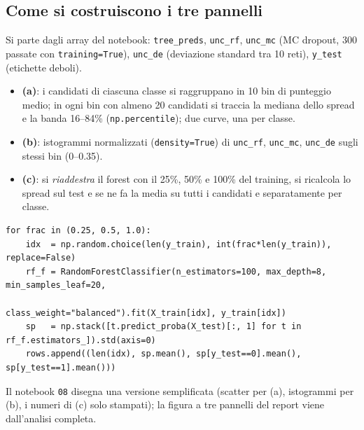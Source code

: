 \documentclass[10.5pt,a4paper]{article}
\begin{document}
\subsection*{Come si costruiscono i tre pannelli}
Si parte dagli array del notebook: \texttt{tree\_preds}, \texttt{unc\_rf}, \texttt{unc\_mc} (MC dropout, 300 passate con
\texttt{training=True}), \texttt{unc\_de} (deviazione standard tra 10 reti), \texttt{y\_test} (etichette deboli).
\begin{itemize}
\item \textbf{(a)}: i candidati di ciascuna classe si raggruppano in 10 bin di punteggio medio; in ogni bin con almeno 20
candidati si traccia la mediana dello spread e la banda 16--84\% (\texttt{np.percentile}); due curve, una per classe.
\item \textbf{(b)}: istogrammi normalizzati (\texttt{density=True}) di \texttt{unc\_rf}, \texttt{unc\_mc}, \texttt{unc\_de} sugli stessi bin
(0--0.35).
\item \textbf{(c)}: si \emph{riaddestra} il forest con il 25\%, 50\% e 100\% del training, si ricalcola lo spread sul test e se ne fa
la media su tutti i candidati e separatamente per classe.
\end{itemize}
\begin{center}\begin{minipage}{0.92\linewidth}\footnotesize
\begin{verbatim}
for frac in (0.25, 0.5, 1.0):
    idx  = np.random.choice(len(y_train), int(frac*len(y_train)), replace=False)
    rf_f = RandomForestClassifier(n_estimators=100, max_depth=8, min_samples_leaf=20,
                                  class_weight="balanced").fit(X_train[idx], y_train[idx])
    sp   = np.stack([t.predict_proba(X_test)[:, 1] for t in rf_f.estimators_]).std(axis=0)
    rows.append((len(idx), sp.mean(), sp[y_test==0].mean(), sp[y_test==1].mean()))
\end{verbatim}
\end{minipage}\end{center}
Il notebook \texttt{08} disegna una versione semplificata (scatter per (a), istogrammi per (b), i numeri di (c) solo stampati); la
figura a tre pannelli del report viene dall'analisi completa.
\end{document}
